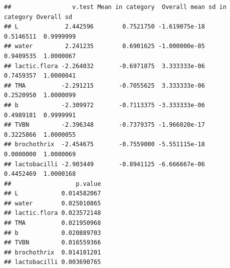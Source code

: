 \documentclass[
]{book}
\newenvironment{Shaded}{\begin{snugshade}}{\end{snugshade}}
\newcommand{\AttributeTok}[1]{\textcolor[rgb]{0.77,0.63,0.00}{#1}}
\newcommand{\NormalTok}[1]{#1}
\newcommand{\SpecialCharTok}[1]{\textcolor[rgb]{0.00,0.00,0.00}{#1}}
\newcommand{\StringTok}[1]{\textcolor[rgb]{0.31,0.60,0.02}{#1}}
\begin{document}
\begin{Shaded}
\end{Shaded}

\begin{verbatim}
##                 v.test Mean in category  Overall mean sd in category Overall sd
## L             2.442596        0.7521750 -1.619075e-18      0.5146511  0.9999999
## water         2.241235        0.6901625 -1.000000e-05      0.9409535  1.0000067
## lactic.flora -2.264032       -0.6971875  3.333333e-06      0.7459357  1.0000041
## TMA          -2.291215       -0.7055625  3.333333e-06      0.2520950  1.0000099
## b            -2.309972       -0.7113375 -3.333333e-06      0.4989181  0.9999991
## TVBN         -2.396348       -0.7379375 -1.966020e-17      0.3225866  1.0000055
## brochothrix  -2.454675       -0.7559000 -5.551115e-18      0.0000000  1.0000069
## lactobacilli -2.903449       -0.8941125 -6.666667e-06      0.4452469  1.0000168
##                  p.value
## L            0.014582067
## water        0.025010865
## lactic.flora 0.023572148
## TMA          0.021950968
## b            0.020889703
## TVBN         0.016559366
## brochothrix  0.014101201
## lactobacilli 0.003690765
\end{verbatim}

\begin{Shaded}
\end{Shaded}
\end{document}
